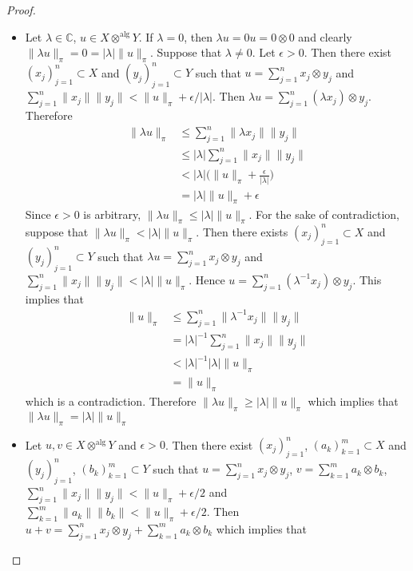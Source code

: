 \documentclass[12pt]{amsart}
\theoremstyle{definition}
\newcommand{\lam}{\lambda}
\newcommand{\ep}{\epsilon}
\newcommand{\C}{\mathbb{C}}
\begin{document}
	\begin{proof}\
	\begin{itemize}
	\item Let $\lam \in \C$, $u \in X \otimes^{\text{alg}} Y$. If $\lam = 0$, then $\lam u = 0  u = 0 \otimes 0$ and clearly $\|\lam u\|_{\pi} = 0 = |\lam|\|u\|_{\pi}$. Suppose that $\lam \neq 0$. Let $\ep >0$. Then there exist $(x_j)_{j=1}^n \subset X$ and $(y_j)_{j=1}^n \subset Y$ such that $u = \sum\limits_{j=1}^n x_j \otimes y_j $ and $\sum\limits_{j=1}^n \|x_j\| \|y_j\| < \|u\|_{\pi} + \ep/|\lam| $. Then $\lam u = \sum\limits_{j=1}^n (\lam x_j) \otimes y_j $.
	Therefore
	\begin{align*}
	\|\lam u\|_{\pi} 
	& \leq \sum\limits_{j=1}^n \|\lam x_j\| \|y_j\| \\
	& \leq |\lam| \sum\limits_{j=1}^n \| x_j\| \|y_j\| \\
	& < |\lam| \bigg( \|u\|_{\pi} + \frac{\ep}{|\lam|} \bigg) \\
	& = |\lam| \|u\|_{\pi} + \ep
	\end{align*}
	Since $\ep >0$ is arbitrary, $\|\lam u\|_{\pi} \leq |\lam| \|u\|_{\pi} $. For the sake of contradiction, suppose that $\|\lam u\|_{\pi} < |\lam| \|u\|_{\pi} $. Then there exists $(x_j)_{j=1}^n \subset X$ and $(y_j)_{j=1}^n \subset Y$ such that $\lam u = \sum\limits_{j=1}^n x_j \otimes y_j $ and $\sum\limits_{j=1}^n \|x_j\| \|y_j\| < |\lam| \|u\|_{\pi}$. Hence $u = \sum\limits_{j=1}^n (\lam^{-1}x_j) \otimes y_j$. This implies that 
	\begin{align*}
	\|u \|_{\pi} 
	& \leq \sum\limits_{j=1}^n \|\lam^{-1}x_j\| \|y_j\| \\
	&= |\lam |^{-1}\sum\limits_{j=1}^n \|x_j\| \|y_j\| \\
	&< |\lam |^{-1} |\lam| \|u\|_{\pi} \\
	&= \|u\|_{\pi}
	\end{align*}
	which is a contradiction. Therefore $\|\lam u\|_{\pi} \geq |\lam| \|u\|_{\pi}$ which implies that $\|\lam u\|_{\pi} = |\lam| \|u\|_{\pi}$
	\item Let $u, v \in X \otimes^{\text{alg}} Y$ and $\ep >0$. Then there exist $(x_j)_{j=1}^n$, $(a_k)_{k=1}^m \subset X$ and $(y_j)_{j=1}^n$, $(b_k)_{k=1}^m \subset Y$ such that $u = \sum\limits_{j=1}^n x_j \otimes y_j $, $v = \sum\limits_{k=1}^m a_k \otimes b_k $, $\sum\limits_{j=1}^n \|x_j\| \|y_j\| < \|u\|_{\pi} + \ep/2$ and $\sum\limits_{k=1}^m \|a_k\| \|b_k\| < \|u\|_{\pi} + \ep/2$. Then $u+v = \sum\limits_{j=1}^n x_j \otimes y_j + \sum\limits_{k=1}^m a_k \otimes b_k $ which implies that 

\end{itemize}
\end{proof}
\end{document}
